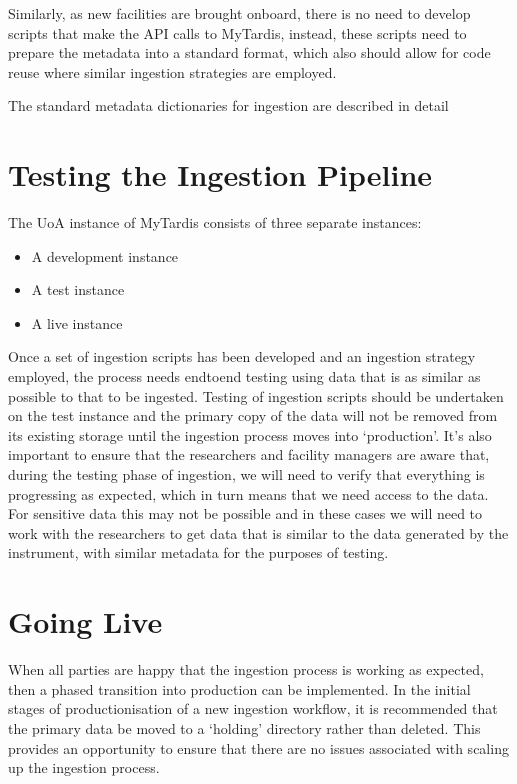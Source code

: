 \documentclass[letterpaper,10pt,english]{sphinxmanual}
\begin{document}
\sphinxAtStartPar
Similarly, as new facilities are brought onboard, there is no need to develop scripts that make the API calls to MyTardis, instead, these scripts need to prepare the metadata into a standard format, which also should allow for code reuse where similar ingestion strategies are employed.

\sphinxAtStartPar
The standard metadata dictionaries for ingestion are described in detail 


\section{Testing the Ingestion Pipeline}
\label{\detokenize{index:testing-the-ingestion-pipeline}}\label{\detokenize{index:testing}}
\sphinxAtStartPar
The UoA instance of MyTardis consists of three separate instances:
\begin{itemize}
\item {} 
\sphinxAtStartPar
A development instance

\item {} 
\sphinxAtStartPar
A test instance

\item {} 
\sphinxAtStartPar
A live instance

\end{itemize}

\sphinxAtStartPar
Once a set of ingestion scripts has been developed and an ingestion strategy employed, the process needs end\sphinxhyphen{}to\sphinxhyphen{}end testing using data that is as similar as possible to that to be ingested. Testing of ingestion scripts should be undertaken on the test instance and the primary copy of the data will not be removed from its existing storage until the ingestion process moves into ‘production’. It’s also important to ensure that the researchers and facility managers are aware that, during the testing phase of ingestion, we will need to verify that everything is progressing as expected, which in turn means that we need access to the data. For sensitive data this may not be possible and in these cases we will need to work with the researchers to get data that is similar to the data generated by the instrument, with similar metadata for the purposes of testing.


\section{Going Live}
\label{\detokenize{index:going-live}}\label{\detokenize{index:id5}}
\sphinxAtStartPar
When all parties are happy that the ingestion process is working as expected, then a phased transition into production can be implemented. In the initial stages of productionisation of a new ingestion workflow, it is recommended that the primary data be moved to a ‘holding’ directory rather than deleted. This provides an opportunity to ensure that there are no issues associated with scaling up the ingestion process.
\end{document}
